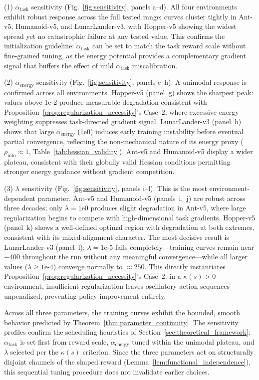 \documentclass[journal]{IEEEtran}
\begin{document}
	(1) $\alpha_{\text{task}}$ sensitivity (Fig.~\ref{fig:sensitivity}, panels a--d). All four environments exhibit robust response across the full tested range: curves cluster tightly in Ant-v5, Humanoid-v5, and LunarLander-v3, with Hopper-v5 showing the widest spread yet no catastrophic failure at any tested value. This confirms the initialization guideline: $\alpha_{\text{task}}$ can be set to match the task reward scale without fine-grained tuning, as the energy potential provides a complementary gradient signal that buffers the effect of mild $\alpha_{\text{task}}$ miscalibration.
	
	(2) $\alpha_{\text{energy}}$ sensitivity (Fig.~\ref{fig:sensitivity}, panels e--h). A unimodal response is confirmed across all environments. Hopper-v5 (panel~g) shows the sharpest peak: values above 1e-2 produce measurable degradation consistent with Proposition~\ref{prop:regularization_necessity}'s Case~2, where excessive energy weighting suppresses task-directed gradient signal. LunarLander-v3 (panel~h) shows that large $\alpha_{\text{energy}}$ (1e0) induces early training instability before eventual partial convergence, reflecting the non-mechanical nature of its energy proxy ($\rho_{\text{info}}\approx 1$, Table~\ref{tab:hessian_validity}). Ant-v5 and Humanoid-v5 display a wider plateau, consistent with their globally valid Hessian conditions permitting stronger energy guidance without gradient competition.
	
	(3) $\lambda$ sensitivity (Fig.~\ref{fig:sensitivity}, panels i--l). This is the most environment-dependent parameter. Ant-v5 and Humanoid-v5 (panels~i,~j) are robust across three decades; only $\lambda=\text{1e0}$ produces slight degradation in Ant-v5, where large regularization begins to compete with high-dimensional task gradients. Hopper-v5 (panel~k) shows a well-defined optimal region with degradation at both extremes, consistent with its mixed-alignment character. The most decisive result is LunarLander-v3 (panel~l): $\lambda=\text{1e-5}$ fails completely---training curves remain near $-400$ throughout the run without any meaningful convergence---while all larger values ($\lambda\geq\text{1e-4}$) converge normally to $\approx250$. This directly instantiates Proposition~\ref{prop:regularization_necessity}'s Case~2: in a $\kappa(s)>0$ environment, insufficient regularization leaves oscillatory action sequences unpenalized, preventing policy improvement entirely.
	
	Across all three parameters, the training curves exhibit the bounded, smooth behavior predicted by Theorem~\ref{thm:parameter_continuity}. The sensitivity profiles confirm the scheduling heuristics of Section~\ref{sec:theoretical_framework}: $\alpha_{\text{task}}$ is set first from reward scale, $\alpha_{\text{energy}}$ tuned within the unimodal plateau, and $\lambda$ selected per the $\kappa(s)$ criterion. Since the three parameters act on structurally disjoint channels of the shaped reward (Lemma~\ref{lem:functional_independence}), this sequential tuning procedure does not invalidate earlier choices.
	
\end{document}
